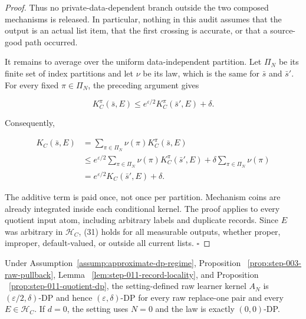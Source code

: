 \begin{proof}
Thus no private-data-dependent branch outside the two composed mechanisms
is released. In particular, nothing in this audit assumes that the output
is an actual list item, that the first crossing is accurate, or that a
source-good path occurred.

It remains to average over the uniform data-independent partition. Let
\(\Pi_N\) be its finite set of index partitions and let \(\nu\) be its law,
which is the same for \(\bar s\) and \(\bar s'\). For every fixed
\(\pi\in\Pi_N\), the preceding argument gives

\[
 K_C^{\pi}(\bar s,E)
 \leq e^{\varepsilon/2}K_C^{\pi}(\bar s',E)+\delta.
\tag{34}
\]

Consequently,

\[
\begin{aligned}
 K_C(\bar s,E)
 &=\sum_{\pi\in\Pi_N}\nu(\pi)K_C^{\pi}(\bar s,E)\\
 &\leq e^{\varepsilon/2}
       \sum_{\pi\in\Pi_N}\nu(\pi)K_C^{\pi}(\bar s',E)
       +\delta\sum_{\pi\in\Pi_N}\nu(\pi)\\
 &=e^{\varepsilon/2}K_C(\bar s',E)+\delta.
\end{aligned}
\tag{35}
\]

The additive term is paid once, not once per partition. Mechanism coins are
already integrated inside each conditional kernel. The proof applies to
every quotient input atom, including arbitrary labels and duplicate
records. Since \(E\) was arbitrary in \(\mathcal H_C\), (31) holds for all
measurable outputs, whether proper, improper, default-valued, or outside all
current lists. \(\square\)


\end{proof}

\begin{proposition}\label{prop:step-011-raw-dp}
Under Assumption~\ref{assump:approximate-dp-regime}, Proposition
~\ref{prop:step-003-raw-pullback}, Lemma
~\ref{lem:step-011-record-locality}, and Proposition
~\ref{prop:step-011-quotient-dp}, the setting-defined raw learner kernel
\(A_N\) is \((\varepsilon/2,\delta)\)-DP and hence
\((\varepsilon,\delta)\)-DP for every raw replace-one pair and every
\(E\in\mathcal H_C\). If \(d=0\), the setting uses \(N=0\) and the law is
exactly \((0,0)\)-DP.


\end{proposition}

